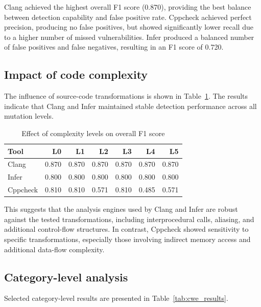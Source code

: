 \documentclass[11pt,a4paper]{article}
\begin{document}
Clang achieved the highest overall F1 score (0.870), providing the best balance
between detection capability and false positive rate. Cppcheck achieved perfect
precision, producing no false positives, but showed significantly lower recall due
to a higher number of missed vulnerabilities. Infer produced a balanced number of
false positives and false negatives, resulting in an F1 score of 0.720.


\subsection{Impact of code complexity}

The influence of source-code transformations is shown in Table~\ref{tab:complexity}.
The results indicate that Clang and Infer maintained stable detection performance
across all mutation levels.

\begin{table}[ht]
\centering
\caption{Effect of complexity levels on overall F1 score}
\begin{tabular}{lrrrrrr}
\hline
Tool & L0 & L1 & L2 & L3 & L4 & L5\\
\hline
Clang & 0.870 & 0.870 & 0.870 & 0.870 & 0.870 & 0.870\\
Infer & 0.800 & 0.800 & 0.800 & 0.800 & 0.800 & 0.800\\
Cppcheck & 0.810 & 0.810 & 0.571 & 0.810 & 0.485 & 0.571\\
\hline
\end{tabular}
\label{tab:complexity}
\end{table}


This suggests that the analysis engines used by Clang and Infer are robust against
the tested transformations, including interprocedural calls, aliasing, and additional
control-flow structures. In contrast, Cppcheck showed sensitivity to specific
transformations, especially those involving indirect memory access and additional
data-flow complexity.


\subsection{Category-level analysis}

Selected category-level results are presented in Table~\ref{tab:cwe_results}.
\end{document}
